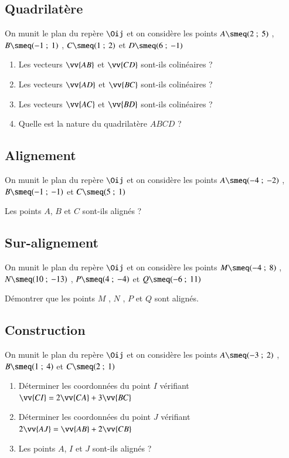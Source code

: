\documentclass[oneside,12pt]{article}          %
\begin{document}
\subsection{Quadrilatère}
On munit le plan du repère $\Oij$ et on considère les points $A\smeq(2~;~5)$ , $B\smeq(-1~;~1)$ , $C\smeq(1~;~2)$ et $D\smeq(6~;~-1)$
\begin{enumerate}
	\item Les vecteurs $\vv{AB}$ et $\vv{CD}$ sont-ils colinéaires ?
	\item Les vecteurs $\vv{AD}$ et $\vv{BC}$ sont-ils colinéaires ?
	\item Les vecteurs $\vv{AC}$ et $\vv{BD}$ sont-ils colinéaires ?
	\item Quelle est la nature du quadrilatère $ABCD$ ? 
\end{enumerate}



\subsection{Alignement}
On munit le plan du repère $\Oij$ et on considère les points $A\smeq(-4~;~-2)$ , $B\smeq(-1~;~-1)$ et $C\smeq(5~;~1)$

Les points $A$, $B$ et $C$ sont-ils alignés ?



\subsection{Sur-alignement}
On munit le plan du repère $\Oij$ et on considère les points $M\smeq(-4~;~8)$ , $N\smeq(10~;~-13)$ , $P\smeq(4~;~-4)$ et $Q\smeq(-6~;~11)$

Démontrer que les points $M$ , $N$ , $P$ et $Q$  sont alignés.



\subsection{Construction}
On munit le plan du repère $\Oij$ et on considère les points $A\smeq(-3~;~2)$ , $B\smeq(1~;~4)$ et $C\smeq(2~;~1)$
\begin{enumerate}
	 \item Déterminer les coordonnées du point $I$ vérifiant $\vv{CI}=2\vv{CA}+3\vv{BC}$
	 \item Déterminer les coordonnées du point $J$ vérifiant $2\vv{AJ}=\vv{AB}+2\vv{CB}$
	 \item Les points $A$, $I$ et $J$ sont-ils alignés ?
\end{enumerate}
\end{document}
